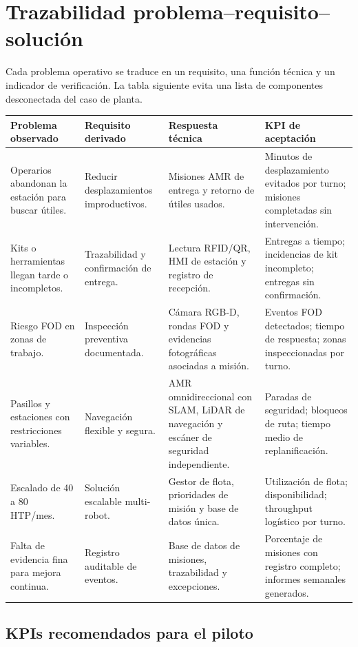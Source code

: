 \chapter{Trazabilidad problema--requisito--solución}

Cada problema operativo se traduce en un requisito, una función técnica y un indicador de verificación. La tabla siguiente evita una lista de componentes desconectada del caso de planta.

\begin{longtable}{P{0.20\textwidth}P{0.20\textwidth}P{0.26\textwidth}P{0.24\textwidth}}
\toprule
\textbf{Problema observado} & \textbf{Requisito derivado} & \textbf{Respuesta técnica} & \textbf{KPI de aceptación}\\
\midrule
\endhead
Operarios abandonan la estación para buscar útiles. & Reducir desplazamientos improductivos. & Misiones AMR de entrega y retorno de útiles usados. & Minutos de desplazamiento evitados por turno; misiones completadas sin intervención.\\
Kits o herramientas llegan tarde o incompletos. & Trazabilidad y confirmación de entrega. & Lectura RFID/QR, HMI de estación y registro de recepción. & Entregas a tiempo; incidencias de kit incompleto; entregas sin confirmación.\\
Riesgo FOD en zonas de trabajo. & Inspección preventiva documentada. & Cámara RGB-D, rondas FOD y evidencias fotográficas asociadas a misión. & Eventos FOD detectados; tiempo de respuesta; zonas inspeccionadas por turno.\\
Pasillos y estaciones con restricciones variables. & Navegación flexible y segura. & AMR omnidireccional con SLAM, LiDAR de navegación y escáner de seguridad independiente. & Paradas de seguridad; bloqueos de ruta; tiempo medio de replanificación.\\
Escalado de 40 a 80 HTP/mes. & Solución escalable multi-robot. & Gestor de flota, prioridades de misión y base de datos única. & Utilización de flota; disponibilidad; throughput logístico por turno.\\
Falta de evidencia fina para mejora continua. & Registro auditable de eventos. & Base de datos de misiones, trazabilidad y excepciones. & Porcentaje de misiones con registro completo; informes semanales generados.\\
\bottomrule
\end{longtable}

\section{KPIs recomendados para el piloto}

